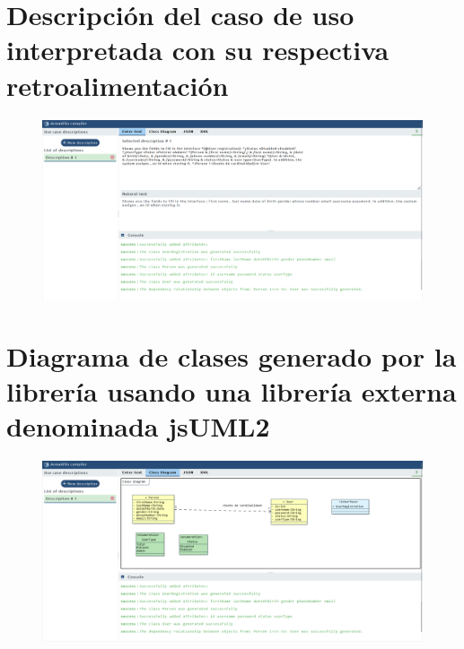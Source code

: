 \section{Descripción del caso de uso interpretada con su respectiva retroalimentación}
\begin{figure}[H]
	\centering
	\includegraphics[width=15cm]{img/anexo3.png}
	\label{fig:anexo3}
\end{figure} 

\section{Diagrama de clases generado por la librería usando una librería externa denominada jsUML2}
\begin{figure}[H]
	\centering
	\includegraphics[width=15cm]{img/anexo4.png}
	\label{fig:anexo4}
\end{figure} 

